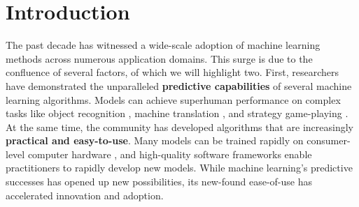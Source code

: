 \chapter{Introduction}
\label{chapter:introduction}









The past decade has witnessed a wide-scale adoption of machine learning methods across numerous application domains.
This surge is due to the confluence of several factors, of which we will highlight two.
First, researchers have demonstrated the unparalleled {\bf predictive capabilities} of several machine learning algorithms.
Models can achieve superhuman performance on complex tasks like object recognition \cite{he2016deep}, machine translation \cite{vaswani2017attention}, and strategy game-playing \cite{silver2017mastering}.
At the same time, the community has developed algorithms that are increasingly {\bf practical and easy-to-use}.
Many models can be trained rapidly on consumer-level computer hardware \cite{howard2018training}, and high-quality software frameworks enable practitioners to rapidly develop new models.
While machine learning's predictive successes has opened up new possibilities, its new-found ease-of-use has accelerated innovation and adoption.

